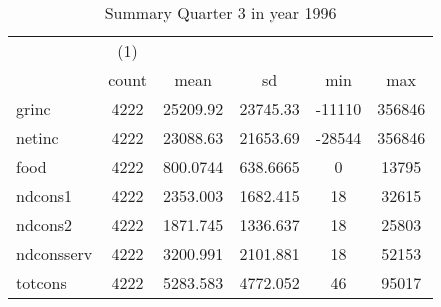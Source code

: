 \begin{table}[htbp]\centering
\def\sym#1{\ifmmode^{#1}\else\(^{#1}\)\fi}
\caption{Summary Quarter 3 in year 1996 \label{sum\_Q3\_y1996}}
\begin{tabular}{l*{1}{ccccc}}
\hline\hline
            &\multicolumn{1}{c}{(1)}&            &            &            &            \\
            &       count&        mean&          sd&         min&         max\\
\hline
grinc       &        4222&    25209.92&    23745.33&      -11110&      356846\\
netinc      &        4222&    23088.63&    21653.69&      -28544&      356846\\
food        &        4222&    800.0744&    638.6665&           0&       13795\\
ndcons1     &        4222&    2353.003&    1682.415&          18&       32615\\
ndcons2     &        4222&    1871.745&    1336.637&          18&       25803\\
ndconsserv  &        4222&    3200.991&    2101.881&          18&       52153\\
totcons     &        4222&    5283.583&    4772.052&          46&       95017\\
\hline\hline
\end{tabular}
\end{table}

